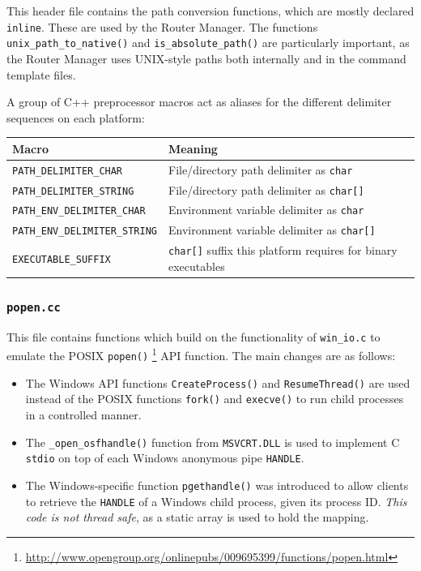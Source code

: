 \documentclass[11pt]{article}
\begin{document}
This header file contains the path conversion functions, which
are mostly declared {\tt inline}. These are used by the Router Manager.
The functions 
{\tt unix\_path\_to\_native()} and
{\tt is\_absolute\_path()}
are particularly important, as the Router Manager
uses UNIX-style paths both internally and in the
command template files.

A group of C++ preprocessor macros act as aliases for the
different delimiter sequences on each platform:
\begin{center}
\begin{tabular}{ | l | l | }
\hline
Macro & Meaning \\ \hline\hline
{\tt PATH\_DELIMITER\_CHAR} & File/directory path delimiter as {\tt char} \\
{\tt PATH\_DELIMITER\_STRING} & File/directory path delimiter as {\tt char[]} \\
{\tt PATH\_ENV\_DELIMITER\_CHAR}	& Environment variable delimiter as {\tt char} \\
{\tt PATH\_ENV\_DELIMITER\_STRING}	& Environment variable delimiter as {\tt char[]} \\
{\tt EXECUTABLE\_SUFFIX } & {\tt char[]} suffix this platform requires for binary executables \\
\hline
\end{tabular}
\end{center}

\subsubsection{{\tt popen.cc}}

This file contains functions which build on the functionality of {\tt win\_io.c}
to emulate the POSIX {\tt popen()}
\footnote{\url{http://www.opengroup.org/onlinepubs/009695399/functions/popen.html}}
API function. The main changes are as follows:

\begin{itemize}
 \item The Windows API functions {\tt CreateProcess()} and {\tt ResumeThread()}
are used instead of the POSIX functions {\tt fork()} and {\tt execve()}
to run child processes in a controlled manner.

  \item The {\tt \_open\_osfhandle()} function from {\tt MSVCRT.DLL}
is used to implement C {\tt stdio} on top of each Windows anonymous pipe {\tt HANDLE}.

  \item The Windows-specific function {\tt pgethandle()}
was introduced to  allow clients to retrieve the {\tt HANDLE} of a Windows
child process, given its process ID.
{\em This code is not thread safe}, as a static array is used to hold the mapping.

\end{itemize}
\end{document}

